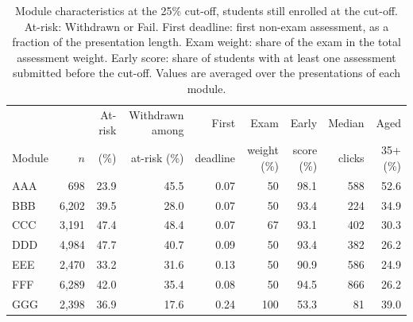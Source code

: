 \begin{table}[t]
\centering
\caption{Module characteristics at the 25\% cut-off, students still enrolled at the cut-off. At-risk: Withdrawn or Fail. First deadline: first non-exam assessment, as a fraction of the presentation length. Exam weight: share of the exam in the total assessment weight. Early score: share of students with at least one assessment submitted before the cut-off. Values are averaged over the presentations of each module.}
\label{tab:modules}
\footnotesize
\begin{tabular}{@{}lrrrrrrrr@{}}
\toprule
 & & At-risk & Withdrawn among & First & Exam & Early & Median & Aged \\
Module & $n$ & (\%) & at-risk (\%) & deadline & weight (\%) & score (\%) & clicks & 35+ (\%) \\
\midrule
AAA & 698 & 23.9 & 45.5 & 0.07 & 50 & 98.1 & 588 & 52.6 \\
BBB & 6,202 & 39.5 & 28.0 & 0.07 & 50 & 93.4 & 224 & 34.9 \\
CCC & 3,191 & 47.4 & 48.4 & 0.07 & 67 & 93.1 & 402 & 30.3 \\
DDD & 4,984 & 47.7 & 40.7 & 0.09 & 50 & 93.4 & 382 & 26.2 \\
EEE & 2,470 & 33.2 & 31.6 & 0.13 & 50 & 90.9 & 586 & 24.9 \\
FFF & 6,289 & 42.0 & 35.4 & 0.08 & 50 & 94.5 & 866 & 26.2 \\
GGG & 2,398 & 36.9 & 17.6 & 0.24 & 100 & 53.3 & 81 & 39.0 \\
\bottomrule
\end{tabular}
\end{table}
